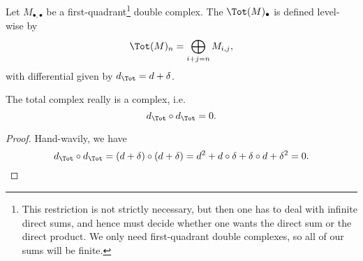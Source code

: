 \documentclass[main.tex]{subfiles}
\begin{document}
\begin{definition}
  \label{def:total_complex}
  Let $M_{\bullet, \bullet}$ be a first-quadrant\footnote{This restriction is not strictly necessary, but then one has to deal with infinite direct sums, and hence must decide whether one wants the direct sum or the direct product. We only need first-quadrant double complexes, so all of our sums will be finite.} double complex. The  $\Tot(M)_{\bullet}$ is defined level-wise by
  \begin{equation*}
    \Tot(M)_{n}  = \bigoplus_{i + j = n} M_{i,j},
  \end{equation*}
  with differential given by $d_{\Tot} = d + \delta$.
\end{definition}

\begin{lemma}
  \label{lemma:total_complex_is_complex}
  The total complex really is a complex, i.e.
  \begin{equation*}
    d_{\Tot} \circ d_{\Tot} = 0.
  \end{equation*}
\end{lemma}
\begin{proof}
  Hand-wavily, we have
  \begin{equation*}
    d_{\Tot} \circ d_{\Tot} = (d + \delta) \circ (d + \delta) = d^{2} + d \circ \delta + \delta \circ d + \delta^{2} = 0.
  \end{equation*}
\end{proof}
\end{document}
